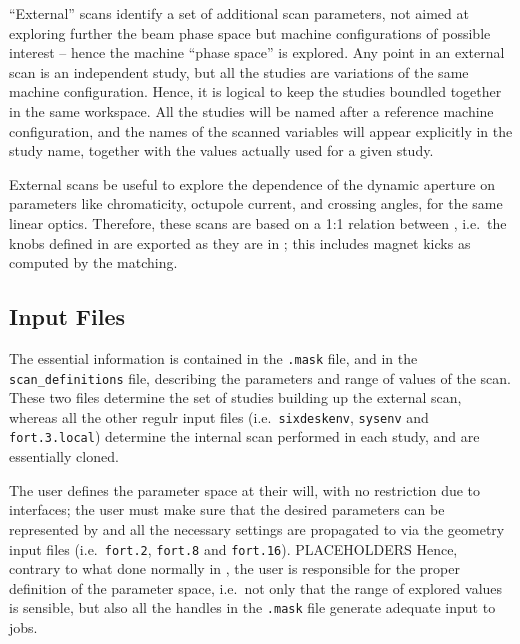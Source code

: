 ``External'' scans identify a set of additional scan parameters, not aimed at
exploring further the beam phase space but machine configurations of possible
interest -- hence the machine ``phase space'' is explored. Any point in
an external scan is an independent \SIXDESK{} study, but all the studies
are variations of the same machine configuration. Hence, it is
logical to keep the studies boundled together in the same workspace.
All the studies will be named after a reference machine configuration,
and the names of the scanned variables will appear explicitly in the study
name, together with the values actually used for a given study.

External scans be useful to explore the dependence of the dynamic aperture
on parameters like chromaticity, octupole current, and crossing angles, 
for the same linear optics. Therefore,
these scans are based on a 1:1 relation between \MADX{}
\SIXTRACK{}, i.e.~the knobs defined in \MADX{} are exported as they
are in \SIXTRACK{}; this includes magnet kicks as computed by the
\MADX{} matching.

\subsection{Input Files}
The essential information is contained in the \texttt{.mask}
file, and in the \texttt{scan\_definitions} file,
describing the parameters and range of values
of the scan. These two files determine the set of studies building
up the external scan, whereas
all the other regulr input files (i.e.~\texttt{sixdeskenv},
\texttt{sysenv} and \texttt{fort.3.local}) determine the
internal scan performed in each study, and are essentially cloned.

The user defines the parameter space at their will, with no
restriction due to interfaces; the user must make sure that
the desired parameters can be represented by \MADX{}
and all the necessary settings are propagated to \SIXTRACK{} via
the geometry input files (i.e.~\texttt{fort.2}, \texttt{fort.8}
and \texttt{fort.16}). PLACEHOLDERS
Hence, contrary to what done normally in
\SIXDESK{}, the user is responsible for the proper definition
of the parameter space, i.e.~not only that the range of explored
values is sensible, but also all the handles in the \texttt{.mask}
file generate adequate input to \SIXTRACK{} jobs.

